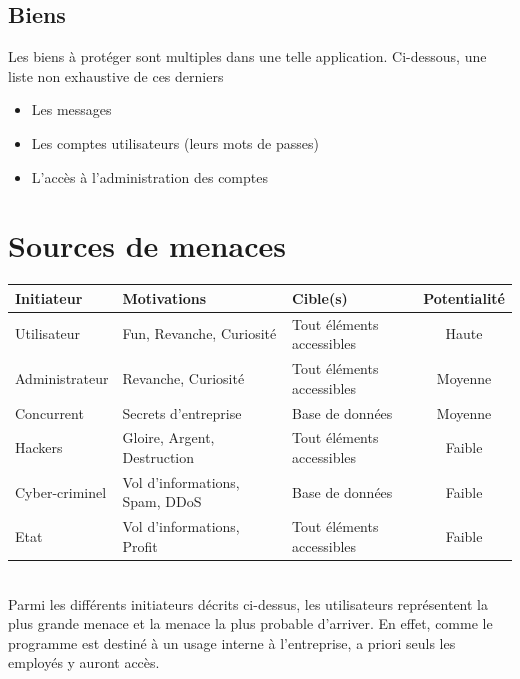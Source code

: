 \documentclass[12pt]{article}
\begin{document}
\subsection{Biens}
Les biens à protéger sont multiples dans une telle application. Ci-dessous, une liste non exhaustive de ces derniers

\begin{itemize}
\item Les messages 
\item Les comptes utilisateurs (leurs mots de passes)
\item L'accès à l'administration des comptes
\end{itemize}

\newpage
\section{Sources de menaces}

\begin{tabular}{| l | l | l | c |}
  \hline			
  \textbf{Initiateur} & \textbf{Motivations} & \textbf{Cible(s)} & \textbf{Potentialité} \\
  \hline
  Utilisateur & Fun, Revanche, Curiosité & Tout éléments accessibles & Haute \\
  Administrateur & Revanche, Curiosité & Tout éléments accessibles & Moyenne \\  
  Concurrent & Secrets d'entreprise & Base de données & Moyenne \\
  Hackers & Gloire, Argent, Destruction & Tout éléments accessibles & Faible \\
  Cyber-criminel & Vol d'informations, Spam, DDoS & Base de données & Faible \\
  Etat & Vol d'informations, Profit & Tout éléments accessibles & Faible \\
  \hline  
\end{tabular}
\\

Parmi les différents initiateurs décrits ci-dessus, les utilisateurs représentent la plus grande menace et la menace la plus probable d'arriver. En effet, comme le programme est destiné à un usage interne à l'entreprise, a priori seuls les employés y auront accès.
\end{document}
